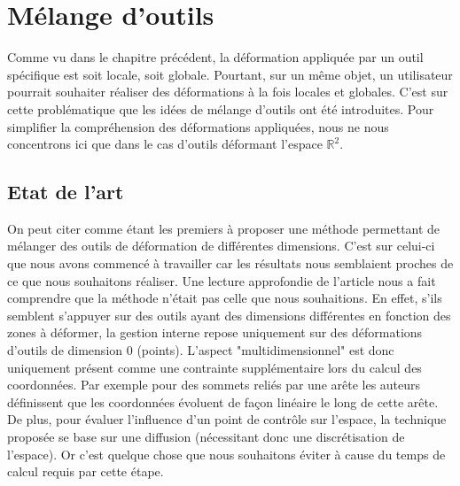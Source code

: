 

\chapter{Mélange d'outils}

\graphicspath{ {Chapter3/Chapter3Figs/PNG/}
  {Chapter3/Chapter3Figs/PDF/} {Chapter3/Chapter3Figs/} }

Comme vu dans le chapitre précédent, la déformation appliquée par un outil
spécifique est soit locale, soit globale. Pourtant, sur un même objet, un
utilisateur pourrait souhaiter réaliser des déformations à la fois locales et
globales. C'est sur cette problématique que les idées de mélange d'outils ont
été introduites. Pour simplifier la compréhension des déformations appliquées,
nous ne nous concentrons ici que dans le cas d'outils déformant l'espace
$\mathbb{R}^2$.

\section{Etat de l'art}

On peut citer \cite{JBPS11} comme étant les premiers à proposer une méthode
permettant de mélanger des outils de déformation de différentes dimensions.
C'est sur celui-ci que nous avons commencé à travailler car les résultats nous
semblaient proches de ce que nous souhaitons réaliser. Une lecture approfondie
de l'article nous a fait comprendre que la méthode n'était pas celle que nous
souhaitions. En effet, s'ils semblent s'appuyer sur des outils ayant des
dimensions différentes en fonction des zones à déformer, la gestion interne
repose uniquement sur des déformations d'outils de dimension 0 (points).
L'aspect "multidimensionnel" est donc uniquement présent comme une contrainte
supplémentaire lors du calcul des coordonnées. Par exemple pour des sommets
reliés par une arête les auteurs définissent que les coordonnées évoluent de
façon linéaire le long de cette arête. De plus, pour évaluer l'influence d'un
point de contrôle sur l'espace, la technique proposée se base sur une diffusion
(nécessitant donc une discrétisation de l'espace). Or c'est quelque chose que
nous souhaitons éviter à cause du temps de calcul requis par cette étape. \\

